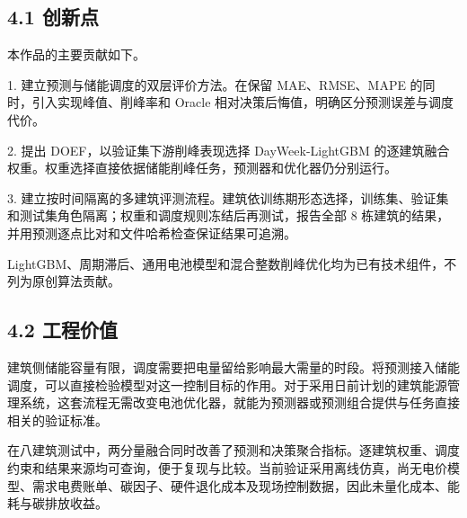 \documentclass[12pt,a4paper]{article}
\begin{document}
\subsection{4.1 创新点}
本作品的主要贡献如下。\par
1. 建立预测与储能调度的双层评价方法。在保留 MAE、RMSE、MAPE 的同时，引入实现峰值、削峰率和 Oracle 相对决策后悔值，明确区分预测误差与调度代价。\par
2. 提出 DOEF，以验证集下游削峰表现选择 DayWeek-LightGBM 的逐建筑融合权重。权重选择直接依据储能削峰任务，预测器和优化器仍分别运行。\par
3. 建立按时间隔离的多建筑评测流程。建筑依训练期形态选择，训练集、验证集和测试集角色隔离；权重和调度规则冻结后再测试，报告全部 8 栋建筑的结果，并用预测逐点比对和文件哈希检查保证结果可追溯。\par
LightGBM、周期滞后、通用电池模型和混合整数削峰优化均为已有技术组件，不列为原创算法贡献。\par
\subsection{4.2 工程价值}
建筑侧储能容量有限，调度需要把电量留给影响最大需量的时段。将预测接入储能调度，可以直接检验模型对这一控制目标的作用。对于采用日前计划的建筑能源管理系统，这套流程无需改变电池优化器，就能为预测器或预测组合提供与任务直接相关的验证标准。\par
在八建筑测试中，两分量融合同时改善了预测和决策聚合指标。逐建筑权重、调度约束和结果来源均可查询，便于复现与比较。当前验证采用离线仿真，尚无电价模型、需求电费账单、碳因子、硬件退化成本及现场控制数据，因此未量化成本、能耗与碳排放收益。\par
\end{document}
